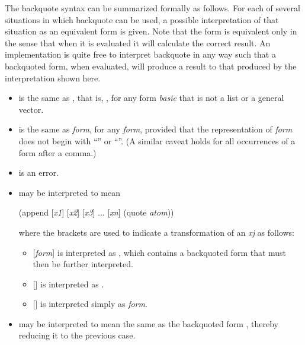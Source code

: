 \begin{flushdesc}
The backquote syntax can be summarized formally as follows.
For each of several situations in which backquote can be used,
a possible interpretation of that situation as an equivalent form
is given.  Note that the form is equivalent only
in the sense that when it is evaluated it will calculate the
correct result.
An implementation is quite free to interpret backquote in any way
such that a backquoted form, when evaluated, will produce a result
 to that produced by the interpretation shown here.
\begin{itemize}
\item
{} is the same as ,
that is, , for any form \emph{basic} that is not a
list or a general vector.

\item
{} is the same as \emph{form}, for any \emph{form}, provided
that the representation of \emph{form} does not begin with ``\cd{{\Xatsign}}''
or ``''.  (A similar caveat holds for all occurrences of a form
after a comma.)

\item
{} is an error.

\item
{} may be interpreted to mean
\begin{lisp}
(append \textrm{[}\emph{x1}\textrm{]} \textrm{[}\emph{x2}\textrm{]}
    \textrm{[}\emph{x3}\textrm{]} ... \textrm{[}\emph{xn}\textrm{]} (quote \emph{atom}))
\end{lisp}
where the brackets are used to indicate
a transformation of an \emph{xj} as follows:
\begin{itemize}
\item
\textrm{[}\emph{form}\textrm{]} is interpreted as , which
contains a backquoted form that must then be further interpreted.

\item
\textrm{[}\textrm{]} is interpreted as .

\item
\textrm{[}\textrm{]} is interpreted simply as \emph{form}.
\end{itemize}

\item
{} may be interpreted to mean
the same as the backquoted form
,
thereby reducing it to the previous case.


\end{itemize}
\end{flushdesc}
